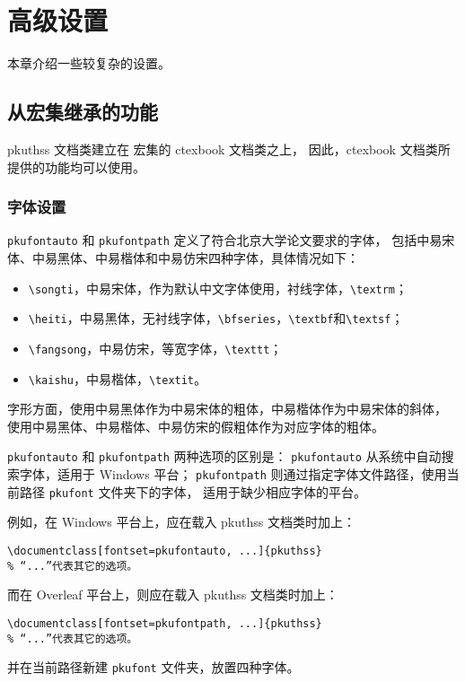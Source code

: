 \chapter{高级设置}
本章介绍一些较复杂的设置。

\section{从\CTeX{}宏集继承的功能}
\label{sec:ctex}
pkuthss 文档类建立在 \CTeX{}宏集的 ctexbook\cite{ctex} 文档类之上，
因此，ctexbook 文档类所提供的功能均可以使用。

\subsection{字体设置}

\texttt{pkufontauto} 和 \texttt{pkufontpath} 定义了符合北京大学论文要求的字体，
包括中易宋体、中易黑体、中易楷体和中易仿宋四种字体，具体情况如下：
\begin{itemize}
    \item \verb|\songti|，中易宋体，作为默认中文字体使用，衬线字体，\verb|\textrm|；
    \item \verb|\heiti|，中易黑体，无衬线字体，\verb|\bfseries|，\verb|\textbf|和\verb|\textsf|；
    \item \verb|\fangsong|，中易仿宋，等宽字体，\verb|\texttt|；
    \item \verb|\kaishu|，中易楷体，\verb|\textit|。
\end{itemize}

字形方面，使用中易黑体作为中易宋体的粗体，中易楷体作为中易宋体的斜体，
使用中易黑体、中易楷体、中易仿宋的假粗体作为对应字体的粗体。

\texttt{pkufontauto} 和 \texttt{pkufontpath} 两种选项的区别是：
\texttt{pkufontauto} 从系统中自动搜索字体，适用于 Windows 平台；
\texttt{pkufontpath} 则通过指定字体文件路径，使用当前路径 \texttt{pkufont} 文件夹下的字体，
适用于缺少相应字体的平台。

例如，在 Windows 平台上，应在载入 pkuthss 文档类时加上：
\begin{Verbatim}
\documentclass[fontset=pkufontauto, ...]{pkuthss}
% “...”代表其它的选项。
\end{Verbatim}
而在 Overleaf 平台上，则应在载入 pkuthss 文档类时加上：
\begin{Verbatim}
\documentclass[fontset=pkufontpath, ...]{pkuthss}
% “...”代表其它的选项。
\end{Verbatim}
并在当前路径新建 \texttt{pkufont} 文件夹，放置四种字体。

